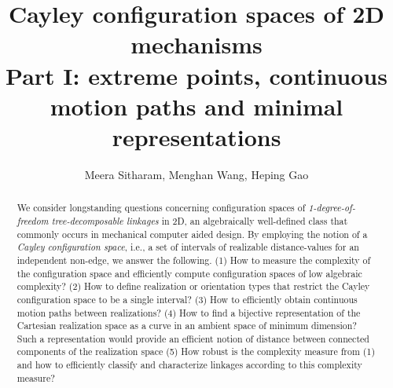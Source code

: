 \documentclass[secthm,amsthm,english]{article}
\theoremstyle{definition}
\theoremstyle{remark}
\begin{document}
\title{Cayley configuration spaces of 2D mechanisms\\
Part I: extreme points, continuous motion paths and minimal representations}


\author{Meera Sitharam, Menghan Wang, Heping Gao}







\maketitle


\begin{abstract}

We consider longstanding questions concerning configuration spaces of
\emph{1-degree-of-freedom tree-decomposable linkages} in 2D, an algebraically
well-defined class that commonly occurs in mechanical computer aided
design. By employing the notion of a \emph{Cayley configuration space}, i.e., a
set of intervals of realizable
distance-values for an independent non-edge, we answer the following.
 (1) How to measure the complexity of the configuration space and efficiently compute configuration
spaces of low algebraic
complexity? (2) How to define realization or orientation types that restrict the Cayley
configuration space to be a single interval? (3) How to efficiently obtain continuous motion paths between realizations?
(4) How to find a bijective representation of the Cartesian
realization space as a curve in an ambient space of minimum dimension? Such a representation would provide an efficient notion of
distance between connected components of
the realization space (5) How robust is the complexity measure from (1) and how to
efficiently classify and characterize linkages according to
this complexity measure?


\end{abstract}
\end{document}
